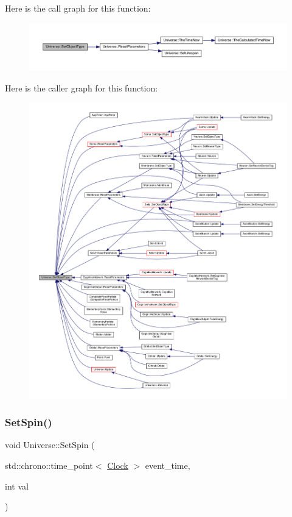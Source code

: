 Here is the call graph for this function\+:
\nopagebreak
\begin{figure}[H]
\begin{center}
\leavevmode
\includegraphics[width=350pt]{class_universe_a2274a54fbdc7504c897e4272162bf17a_cgraph}
\end{center}
\end{figure}
Here is the caller graph for this function\+:
\nopagebreak
\begin{figure}[H]
\begin{center}
\leavevmode
\includegraphics[width=350pt]{class_universe_a2274a54fbdc7504c897e4272162bf17a_icgraph}
\end{center}
\end{figure}
\mbox{\label{class_universe_ae2ae1c3b3e4cde2c18f5f6a814761ec8}} 
\subsubsection{\texorpdfstring{Set\+Spin()}{SetSpin()}}
{\footnotesize\ttfamily void Universe\+::\+Set\+Spin (\begin{DoxyParamCaption}\item[{std\+::chrono\+::time\+\_\+point$<$ \hyperlink{universe_8h_a0ef8d951d1ca5ab3cfaf7ab4c7a6fd80}{Clock} $>$}]{event\+\_\+time,  }\item[{int}]{val }\end{DoxyParamCaption})\hspace{0.3cm}{\ttfamily [virtual]}}



